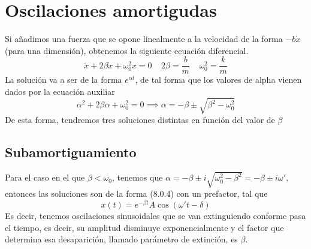 \section{Oscilaciones amortigudas}
Si añadimos una fuerza que se opone linealmente a la velocidad de la forma $-b \dot{x}$ (para una dimensión), obtenemos la siguiente ecuación diferencial.
\begin{equation} \label{6.1.1}
    \ddot{x} + 2\beta\dot{x} + \omega_0^2 x = 0 \ \ \ \ \ 2\beta = \frac{b}{m} \ \ \ \ \ \omega_0^2 = \frac{k}{m}
\end{equation}
La solución va a ser de la forma $e^{\alpha t}$, de tal forma que los valores de alpha vienen dados por la ecuación auxiliar
\begin{equation} \label{6.1.1}
    \alpha^2 + 2\beta\alpha + \omega_0^2= 0 \implies \alpha = -\beta \pm \sqrt{\beta^2-\omega_0^2}
\end{equation}
De esta forma, tendremos tres soluciones distintas en función del valor de $\beta$
\vspace{-15pt}
\subsection{Subamortiguamiento}
Para el caso en el que $\beta < \omega_0$, tenemos que $\alpha = -\beta \pm i \sqrt{\omega_0^2-\beta^2} = -\beta \pm i \omega'$, entonces las soluciones son de la forma (8.0.4) con un prefactor, tal que
\begin{equation} \label{6.1.1}
    x(t) = e^{-\beta t}A\cos(\omega't-\delta)
\end{equation}
Es decir, tenemos oscilaciones sinusoidales que se van extinguiendo conforme pasa el tiempo, es decir, su amplitud disminuye exponencialmente y el factor que determina esa desaparición, llamado parámetro de extinción, es $\beta$.
\vspace{-15pt}
